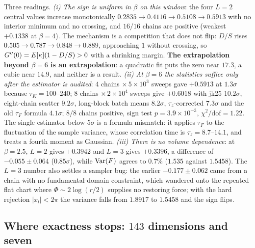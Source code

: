 \noindent
Three readings. \emph{(i) The sign is uniform in $\beta$ on this window}: the four $L=2$ central values
increase monotonically $0.2835\to0.4116\to0.5108\to0.5913$ with no interior minimum and no crossing, and
$16/16$ chains are positive (weakest $+0.1338$ at $\beta=4$). The mechanism is a competition that does
not flip: $D/S$ rises $0.505\to0.787\to0.848\to0.889$, approaching $1$ without crossing, so
$G''(0)=E[\kappa](1-D/S)>0$ with a shrinking margin. \textbf{The extrapolation beyond $\beta=6$ is an
extrapolation}: a quadratic fit puts the zero near $17.3$, a cubic near $14.9$, and neither is a result.
\emph{(ii) At $\beta=6$ the statistics suffice only after the estimator is audited}: $4$ chains
$\times\,5\times10^{3}$ sweeps gave $+0.5913$ at $1.3\sigma$ because $\tau_{K}=100$--$240$; $8$ chains
$\times\,2\times10^{4}$ sweeps give $+0.6018$ with jk25 $10.2\sigma$, eight-chain scatter
$9.2\sigma$, long-block batch means $8.2\sigma$, $\tau_{z}$-corrected $7.3\sigma$ and the old
$\tau_{F}$ formula $4.1\sigma$; $8/8$ chains positive, sign test $p=3.9\times10^{-3}$,
$\chi^{2}/\mathrm{dof}=1.22$. The single estimator below $5\sigma$ is a formula mismatch: it applies
$\tau_{F}$ to the fluctuation of the sample variance, whose correlation time is $\tau_{z}=8.7$--$14.1$,
and treats a fourth moment as Gaussian. \emph{(iii) There is no volume dependence}: at $\beta=2.5$,
$L=2$ gives $+0.3942$ and $L=3$ gives $+0.3396$, a difference of $-0.055\pm0.064$ ($0.85\sigma$), while
$\operatorname{Var}(F)$ agrees to $0.7\%$ ($1.535$ against $1.5458$). The $L=3$ number also settles a sampler bug: the
earlier $-0.177\pm0.062$ came from a chain with no fundamental-domain constraint, which wandered onto
the repeated flat chart where $\Phi\sim2\log(r/2)$ supplies no restoring force; with the hard rejection
$|x_{l}|<2\pi$ the variance falls from $1.8917$ to $1.5458$ and the sign flips.

\subsection{Where exactness stops: $143$ dimensions and seven}
\label{sec:exactness-stops}

